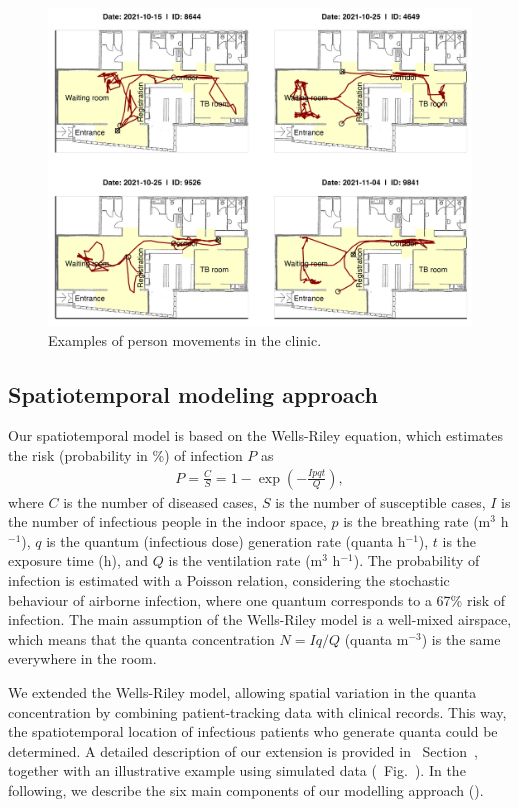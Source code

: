\documentclass[fleqn,11pt]{wlscirep}
\begin{document}
\begin{figure}[!htpb]
    \centering
    \includegraphics{results/data/example-patient-tracks.png}
    \caption{Examples of person movements in the clinic.}
    \label{fig:tracking-examples}
\end{figure}


\subsection*{Spatiotemporal modeling approach}

Our spatiotemporal model is based on the Wells-Riley equation\cite{Riley1961Book}, which estimates the risk (probability in \%) of infection $P$ as
\begin{align}
    P = \frac{C}{S} = 1 - \exp\left(-\frac{Ipqt}{Q}\right),
\end{align}
where $C$ is the number of diseased cases, $S$ is the number of susceptible cases, $I$ is the number of infectious people in the indoor space, $p$ is the breathing rate (m$^3$ h$^{-1}$), $q$ is the quantum (infectious dose) generation rate (quanta h$^{-1}$), $t$ is the exposure time (h), and $Q$ is the ventilation rate (m$^3$ h$^{-1}$). The probability of infection is estimated with a Poisson relation, considering the stochastic behaviour of airborne infection, where one quantum corresponds to a 67\% risk of infection. The main assumption of the Wells-Riley model is a well-mixed airspace, which means that the quanta concentration $N = Iq/Q$ (quanta m$^{-3}$) is the same everywhere in the room. 

We extended the Wells-Riley model, allowing spatial variation in the quanta concentration by combining patient-tracking data with clinical records. This way, the spatiotemporal location of infectious patients who generate quanta could be determined. A detailed description of our extension is provided in \supp~Section~, together with an illustrative example using simulated data (\supp~Fig.~). In the following, we describe the six main components of our modelling approach ().
\end{document}
